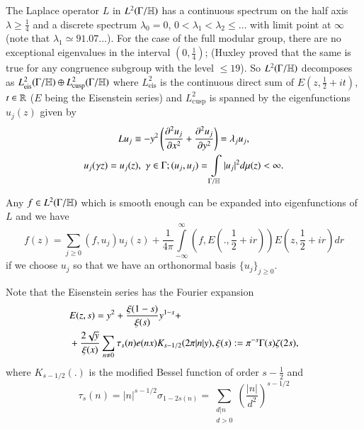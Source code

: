 The Laplace operator $L$ in $L^2 (\Gamma / \mathbb{H})$  has a continuous spectrum on the half axis $\lambda \geqslant \frac{1}{4}$ and a discrete spectrum $\lambda_0=0$, $0< \lambda_1 < \lambda_2 \leqslant \ldots$ with limit point at $\infty$ (note that $\lambda_1 \simeq 91.07\ldots$). For the case of the full modular group, there are no exceptional eigenvalues in the interval $(0, \frac{1}{4})$; (Huxley proved that the same is true for any congruence subgroup with the level $\leqslant 19$). So $L^2 (\Gamma / \mathbb{H})$ decomposes as $L^2_{\text{eis}} (\Gamma /\mathbb{H}) \oplus L^2_{\text{cusp}} (\Gamma / \mathbb{H})$ where $L^2_{\text{eis}}$ is the continuous  direct sum of $E(z, \frac{1}{2}+ it)$, $t \in \mathbb{R}$ ($E$ being the Eisenstein series) and $L^2_{\text{cusp}}$ is spanned by the eigenfunctions $u_j(z)$ given by 
\begin{gather}
Lu_j \equiv - y^2 \left(\frac{\partial^2 u_j}{\partial x^2} + \frac{\partial^2 u_j}{\partial y^2} \right) = \lambda_j u_j, \label{art7-eq1.13}\\
u_j (\gamma z) = u_j  (z), \; \gamma \in \Gamma ; (u_j, u_j) = \int\limits_{\Gamma / \mathbb{H}} |u_j|^2 d\mu (z) < \infty.\notag
\end{gather}

Any $f \in L^2 (\Gamma / \mathbb{H})$ which is smooth enough can be expanded into eigenfunctions of $L$ and we have 
\begin{equation}
f(z) = \sum\limits_{j \geqslant 0} (f, u_j) u_j (z)  + \frac{1}{4\pi} \int\limits^\infty_{-\infty} (f, E (., \frac{1}{2} + ir)) E (z, \frac{1}{2} + ir) dr \label{art7-eq1.14}
\end{equation}
if we choose $u_j$ so that we have an orthonormal basis $\{u_j\}_{j\geqslant 0}$.

Note that the Eisenstein series has the Fourier expansion
\begin{align}
&E (z,s) = y^2 + \frac{\xi (1-s)}{\xi(s)} y^{1-s} + \label{art7-eq1.15} \\
&+ \frac{2\sqrt{y}}{\xi (x)} \sum\limits_{n\neq 0} \tau_s (n) e (nx) K_{s-1/2} (2\pi |n| y), \xi (s) : = \pi^{-s} \Gamma (s) \zeta (2s), \notag
\end{align}
where $K_{s-1/2} (.)$ is the modified Bessel function of order $s - \frac{1}{2}$ and 
\begin{equation}
\tau_s (n) = |n|^{s-1/2} \sigma_{1-2s(n)} = \sum\limits_{\substack{d|n\\d>0}} \left(\frac{|n|}{d^2} \right)^{s-1/2} \label{art7-eq1.16}
\end{equation} 

